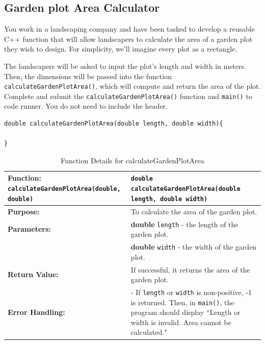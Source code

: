 \subsection{Garden plot Area Calculator}

You work in a landscaping company and have been tasked to develop a reusable C++ function that will allow landscapers to calculate the area of a garden plot they wish to design. For simplicity, we’ll imagine every plot as a rectangle.

The landscapers will be asked to input the plot’s length and width in meters. Then, the dimensions will be passed into the function \texttt{calculateGardenPlotArea()}, which will compute and return the area of the plot. \\

Complete and submit the \texttt{calculateGardenPlotArea()} function and \texttt{main()} to code runner. You do not need to include the header. 

\begin{verbatim}
double calculateGardenPlotArea(double length, double width){

}
\end{verbatim}

\begin{table}[h!]
\centering
\begin{tabular}{|p{1.7in}|p{4.3in}|}
\hline
\textbf{Function:}  \texttt{calculateGardenPlotArea(double, double)} 
& \texttt{double calculateGardenPlotArea(double length, double width)} \\ \hline

\textbf{Purpose:} & To calculate the area of the garden plot. \\ \hline

\textbf{Parameters:} & 
\textbf{double} \texttt{length} - the length of the garden plot. \\
 & \textbf{double} \texttt{width} - the width of the garden plot. \\ \hline

\textbf{Return Value:} & 
If successful, it returns the area of the garden plot. \\ \hline

\textbf{Error Handling:} & 
- If \texttt{length} or \texttt{width} is non-positive, -1 is returned. Then, in \texttt{main()}, the program should display ``Length or width is invalid. Area cannot be calculated."\\ \hline


\end{tabular}
\caption{Function Details for calculateGardenPlotArea}
\end{table}

